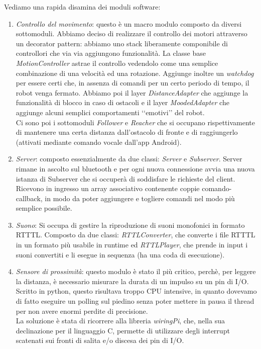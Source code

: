 \documentclass[12pt]{article}
\newcommand{\cbegin}{‘‘}
\newcommand{\cend}{’’}
\begin{document}
Vediamo una rapida disamina dei moduli software:
\begin{enumerate}
\item \emph{Controllo del movimento}: questo è un macro modulo composto da diversi sottomoduli. Abbiamo deciso di realizzare il controllo dei motori attraverso un decorator pattern: abbiamo uno stack liberamente componibile di controllori che via via aggiungono funzionalità. La classe base \emph{MotionController} astrae il controllo vedendolo come una semplice combinazione di una velocità ed una rotazione. Aggiunge inoltre un \emph{watchdog} per essere certi che, in assenza di comandi per un certo periodo di tempo, il robot venga fermato. Abbiamo poi il layer \emph{DistanceAdapter} che aggiunge la funzionalità di blocco in caso di ostacoli e il layer \emph{MoodedAdapter} che aggiunge alcuni semplici comportamenti \cbegin{}emotivi\cend{} del robot.\\
Ci sono poi i sottomoduli \emph{Follower} e \emph{Reacher} che si occupano rispettivamente di mantenere una certa distanza dall'ostacolo di fronte e di raggiungerlo (attivati mediante comando vocale dall'app Android).
\item \emph{Server}: composto essenzialmente da due classi: \emph{Server} e \emph{Subserver}. Server rimane in ascolto sul bluetooth e per ogni nuova connessione avvia una nuova istanza di Subserver che si occuperà di soddisfare le richieste del client.\\
Ricevono in ingresso un array associativo contenente coppie comando-callback, in modo da poter aggiungere e togliere comandi nel modo più semplice possibile.
\item \emph{Suono}: Si occupa di gestire la riproduzione di suoni monofonici in formato RTTTL. Composto da due classi: \emph{RTTLConverter}, che converte i file RTTTL in un formato più usabile in runtime ed \emph{RTTLPlayer}, che prende in input i suoni convertiti e li esegue in sequenza (ha una coda di esecuzione).
\item \emph{Sensore di prossimità}: questo modulo è stato il più critico, perchè, per leggere la distanza, è necessario misurare la durata di un impulso su un pin di I/O. Scritto in python, questo risultava troppo CPU intensive, in quanto dovevamo di fatto eseguire un polling sul piedino senza poter mettere in pausa il thread per non avere enormi perdite di precisione.\\
La soluzione è stata di ricorrere alla libreria \emph{wiringPi}, che, nella sua declinazione per il linguaggio C, permette di utilizzare degli interrupt scatenati sui fronti di salita e/o discesa dei pin di I/O.\\

\end{enumerate}
\end{document}

